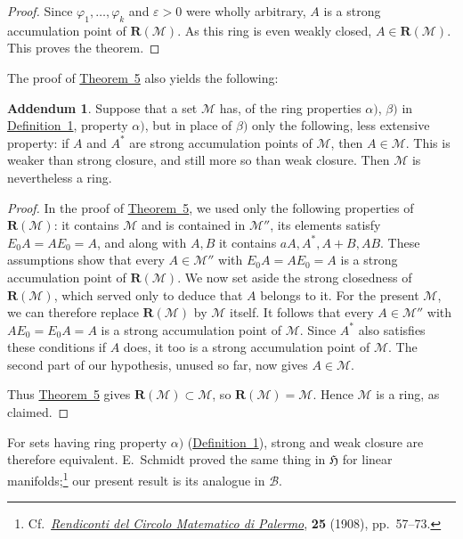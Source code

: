 \documentclass[
  paper=b5,
  twoside=true,
  fontsize=13pt,
  headings=normal,
  bookmarkpackage=false
]{scrartcl}
\theoremstyle{definition}
\newtheorem*{addendum}{Addendum}
\newcommand{\TheoremRef}[1]{\hyperref[thm:#1]{Theorem~#1}}
\newcommand{\DefinitionRef}[1]{\hyperref[def:#1]{Definition~#1}}
\newcommand{\GeneratedRing}{\boldsymbol{R}}
\begin{document}
\begin{proof}
Since \(\varphi_1,\ldots,\varphi_k\) and \(\varepsilon>0\) were wholly
arbitrary, \(A\) is a strong accumulation point of \(\GeneratedRing (\mathcal M)\).
As this ring is even weakly closed, \(A\in \GeneratedRing (\mathcal M)\).  This proves
the theorem.
\end{proof}

The proof of \TheoremRef{5} also yields the following:

\begin{addendum}\label{thm:5-addendum}
Suppose that a set \(\mathcal M\) has, of the ring properties
\(\alpha)\), \(\beta)\) in \DefinitionRef{1}, property \(\alpha)\), but in
place of \(\beta)\) only the following, less extensive property:
if \(A\) and \(A^*\) are strong accumulation points of \(\mathcal M\),
then \(A\in\mathcal M\).  This is weaker than strong closure, and still
more so than weak closure.  Then \(\mathcal M\) is nevertheless a ring.
\end{addendum}

\begin{proof}
In the proof of \TheoremRef{5}, we used only the following properties of
\(\GeneratedRing (\mathcal M)\): it contains \(\mathcal M\) and is contained in
\(\mathcal M''\), its elements satisfy \(E_0A=AE_0=A\), and along with
\(A,B\) it contains \(aA,A^*,A+B,AB\). These assumptions show that every
\(A\in\mathcal M''\) with \(E_0A=AE_0=A\) is a strong accumulation
point of \(\GeneratedRing (\mathcal M)\). We now set aside the strong closedness of
\(\GeneratedRing (\mathcal M)\), which served only to deduce that \(A\) belongs to it.
For the present \(\mathcal M\), we can therefore replace \(\GeneratedRing (\mathcal M)\)
by \(\mathcal M\) itself. It follows that every \(A\in\mathcal M''\) with
\(AE_0=E_0A=A\) is a strong accumulation point of \(\mathcal M\).
Since \(A^*\) also satisfies these conditions if \(A\) does, it too is
a strong accumulation point of \(\mathcal M\). The second part of our
hypothesis, unused so far, now gives \(A\in\mathcal M\).

Thus \TheoremRef{5} gives \(\GeneratedRing (\mathcal M)\subset\mathcal M\), so
\(\GeneratedRing (\mathcal M)=\mathcal M\). Hence \(\mathcal M\) is a ring, as claimed.
\end{proof}

For sets having ring property \(\alpha)\) (\DefinitionRef{1}), strong and
weak closure are therefore equivalent.  E.~Schmidt proved the same
thing in \(\mathfrak H\) for linear manifolds;\footnote{\label{fn:52}Cf.\
\href{https://doi.org/10.1007/BF03029116}{\emph{Rendiconti del Circolo Matematico di Palermo}}, \textbf{25} (1908),
pp.~57--73.}
our present result is its analogue in \(\mathcal B\).
\end{document}
